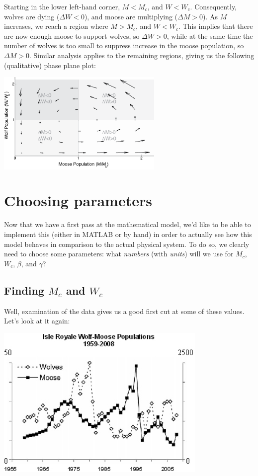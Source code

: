 \documentclass{tufte-handout}
\newcommand{\beforefig}{\vspace{0.2in}}
\newcommand{\afterfig}{\vspace{0.2in}}
\begin{document}
Starting in the lower left-hand corner, $M<M_c$, and $W<W_c$.  Consequently, wolves are dying ($\Delta W<0$), and moose are multiplying ($\Delta M>0$).  As $M$ increases, we reach a region where  $M>M_c$, and $W<W_c$.  This implies that there are now enough moose to support wolves, so $\Delta W>0$, while at the same time the number of wolves is too small to suppress increase in the moose population, so $\Delta M>0$.  Similar analysis applies to the remaining regions, giving us the following (qualitative) phase plane plot:

\beforefig
\centerline{
\includegraphics[width=8cm]{figs/WolfMoosePhasePlaneQuiver.png}}
\afterfig


 \section{Choosing parameters}
 
Now that we have a first pass at the mathematical model, we'd like to be able to implement this (either in MATLAB or by hand) in order to actually see how this model behaves in comparison to the actual physical system.  To do so, we clearly need to choose some parameters:  what {\it numbers} (with {\it units}) will we use for $M_c$, $W_c$, $\beta$, and $\gamma$?

\subsection{Finding $M_c$ and $W_c$}
Well, examination of the data gives us a good first cut at some of these values.  Let's look at it again:

\includegraphics[width=4in]{figs/wolfmoosedata.jpg}
 
\end{document}

